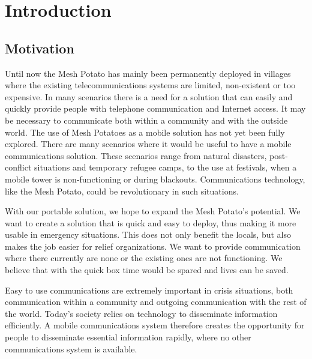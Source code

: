 \chapter{Introduction}
\label{chp:introduction} 

\section{Motivation}
Until now the Mesh Potato has mainly been permanently deployed in villages where the existing telecommunications systems are limited, non-existent or too expensive. In many scenarios there is a need for a solution that can easily and quickly provide people with telephone communication and Internet access. It may be necessary to communicate both within a community and with the outside world. The use of Mesh Potatoes as a mobile solution has not yet been fully explored. There are many scenarios where it would be useful to have a mobile communications solution. These scenarios range from natural disasters, post-conflict situations and temporary refugee camps, to the use at festivals, when a mobile tower is non-functioning or during blackouts. Communications technology, like the Mesh Potato, could be revolutionary in such situations. 

With our portable solution, we hope to expand the Mesh Potato's potential. We want to create a solution that is quick and easy to deploy, thus making it more usable in emergency situations. This does not only benefit the locals, but also makes the job easier for relief organizations. We want to provide communication where there currently are none or the existing ones are not functioning. We believe that with the \gls{quick} box time would be spared and lives can be saved. 

Easy to use communications are extremely important in crisis situations, both communication within a community and outgoing communication with the rest of the world. Today's society relies on technology to disseminate information efficiently. A mobile communications system therefore creates the opportunity for people to disseminate essential information rapidly, where no other communications system is available. 


